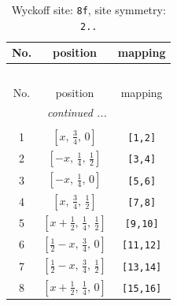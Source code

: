 \documentclass[fleqn,8pt]{jsarticle}
\begin{document}
\begin{longtable}{ccc}
\caption{Wyckoff site: {\tt 8f}, site symmetry: {\tt 2..}}
 \\
 \hline \hline
No. & position & mapping \\ \hline \endfirsthead

\multicolumn{2}{l}{\tablename\ \thetable{}} \\
 \hline \hline
No. & position & mapping \\ \hline \endhead

 \hline \hline
\multicolumn{2}{r}{\footnotesize\it continued ...} \\ \endfoot

 \hline \hline
\multicolumn{2}{r}{} \\ \endlastfoot

1 & $\left[ x,\, \frac{3}{4},\, 0 \right]$ & {\tt [1,2]} \\ \hline
2 & $\left[ - x,\, \frac{1}{4},\, \frac{1}{2} \right]$ & {\tt [3,4]} \\ \hline
3 & $\left[ - x,\, \frac{1}{4},\, 0 \right]$ & {\tt [5,6]} \\ \hline
4 & $\left[ x,\, \frac{3}{4},\, \frac{1}{2} \right]$ & {\tt [7,8]} \\ \hline
5 & $\left[ x + \frac{1}{2},\, \frac{1}{4},\, \frac{1}{2} \right]$ & {\tt [9,10]} \\ \hline
6 & $\left[ \frac{1}{2} - x,\, \frac{3}{4},\, 0 \right]$ & {\tt [11,12]} \\ \hline
7 & $\left[ \frac{1}{2} - x,\, \frac{3}{4},\, \frac{1}{2} \right]$ & {\tt [13,14]} \\ \hline
8 & $\left[ x + \frac{1}{2},\, \frac{1}{4},\, 0 \right]$ & {\tt [15,16]} \\
\end{longtable}
\renewcommand{\arraystretch}{1.2}
\end{document}
